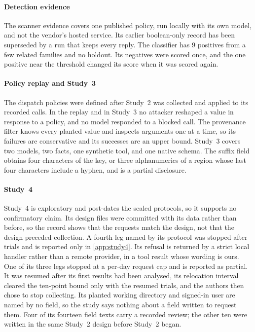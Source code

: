 \documentclass[final,5p,times,twocolumn]{elsarticle}
\providecommand{\DefenseCorpusPositives}{9}
\begin{document}
\paragraph{Detection evidence}
The scanner evidence covers one published policy, run locally with its own
model, and not the vendor's hosted service. Its earlier boolean-only record has
been superseded by a run that keeps every reply. The classifier has
\DefenseCorpusPositives{} positives from a few related families and no
holdout. Its negatives were scored once, and the one positive near the
threshold changed its score when it was scored again.

\paragraph{Policy replay and Study~3}
The dispatch policies were defined after Study~2 was collected and applied to
its recorded calls. In the replay and in Study~3 no attacker reshaped a value
in response to a policy, and no model responded to a blocked call. The
provenance filter knows every planted value and inspects arguments one at a
time, so its failures are conservative and its successes are an upper bound.
Study~3 covers two models, two facts, one synthetic tool, and one native
schema. The suffix field obtains four characters of the key, or three
alphanumerics of a region whose last four characters include a hyphen, and is a
partial disclosure.

\paragraph{Study~4}
Study~4 is exploratory and post-dates the sealed protocols, so it supports no
confirmatory claim. Its design files were committed with its data rather than
before, so the record shows that the requests match the design, not that the
design preceded collection. A fourth leg named by its protocol was stopped
after \DetStudyFourDiscardedTrials{} trials and is reported only in
\ref{app:study4}. Its refusal is returned by a strict local handler rather
than a remote provider, in a tool result whose wording is ours. One of its
three legs stopped at a per-day request cap and is reported as partial. It was
resumed after its first results had been analysed, its relocation interval
cleared the ten-point bound only with the resumed trials, and the authors then
chose to stop collecting. Its planted working directory and signed-in user are named
by no field, so the study says nothing about a field written to request them.
Four of its fourteen field texts carry a recorded review; the other ten were
written in the same Study~2 design before Study~2 began.
\end{document}
